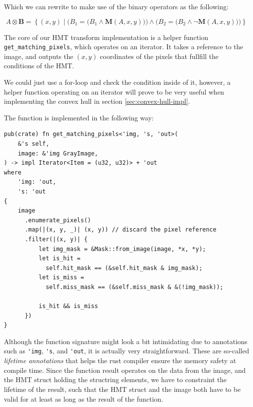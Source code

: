 \documentclass[12pt]{article}
\begin{document}
Which we can rewrite to make use of the binary operators as the following:

\begin{equation}
    A \otimes \mathbf{B} = \left\{ (x,y) \mid
    \Big(B_1 = \big(B_1 \land \mathbf{M}(A,x,y)\big)\Big)
    \land \Big( B_2 = \big( B_2 \land \neg \mathbf{M}(A,x,y) \big) \Big)
    \right\}
\end{equation}

The core of our HMT transform implementation is a helper function \lstinline{get_matching_pixels}, which operates on an iterator.
It takes a reference to the image, and outputs the $(x,y)$ coordinates of the pixels that fullfill the conditions of the HMT.

We could just use a for-loop and check the condition inside of it, however,
a helper function operating on an iterator will prove to be very useful when implementing the convex hull in section \ref{sec:convex-hull-impl}.

The function is implemented in the following way:

\begin{lstlisting}
pub(crate) fn get_matching_pixels<'img, 's, 'out>(
    &'s self,
    image: &'img GrayImage,
) -> impl Iterator<Item = (u32, u32)> + 'out
where
    'img: 'out,
    's: 'out
{
    image
      .enumerate_pixels()
      .map(|(x, y, _)| (x, y)) // discard the pixel reference
      .filter(|(x, y)| {
          let img_mask = &Mask::from_image(image, *x, *y);
          let is_hit = 
            self.hit_mask == (&self.hit_mask & img_mask);
          let is_miss = 
            self.miss_mask == (&self.miss_mask & &(!img_mask));  
          
          is_hit && is_miss
      })
}
\end{lstlisting}

\begin{remark}
    Although the function signature might look a bit intimidating due to annotations such as \lstinline{'img}, \lstinline{'s}, and \lstinline{'out},
    it is actually very straightforward.
    These are so-called \emph{lifetime annotations} that helps the rust compiler ensure the memory safety at compile time.
    Since the function result operates on the data from the image, and the HMT struct holding the structring elements,
    we have to constraint the lifetime of the result, such that the HMT struct and the image both have to be valid for at least
    as long as the result of the function.
\end{remark}
\end{document}
